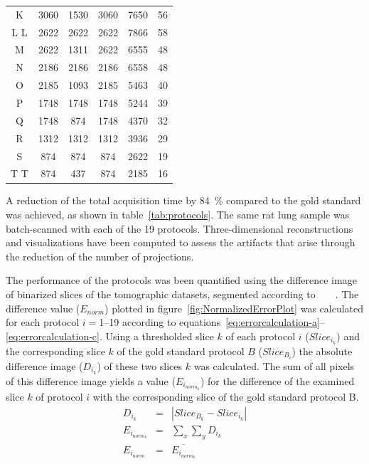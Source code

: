 \begin{table}
\begin{tabular}{cccccc}
		K & 3060 & 1530 & 3060 & 7650  &  56\\%
		\ifiucr
			\rowcolor{lightgray} L 
		\else
		 	L
		 \fi
		 & 2622 & 2622 & 2622 & 7866  &  58\\%
		M & 2622 & 1311 & 2622 & 6555  &  48\\%
		N & 2186 & 2186 & 2186 & 6558  &  48\\%
		O & 2185 & 1093 & 2185 & 5463  &  40\\%
		P & 1748 & 1748 & 1748 & 5244  &  39\\%
		Q & 1748 & 874  & 1748 & 4370  &  32\\%
		R & 1312 & 1312 & 1312 & 3936  &  29\\%
		S & 874  & 874  & 874  & 2622  &  19\\%
		\ifiucr
			\rowcolor{lightgray} T
		\else
		 	T
		 \fi
		& 874  & 437  & 874  & 2185  &  16\\%
	\end{tabular}%
\end{table}

A reduction of the total acquisition time by \SI{84}{\percent} compared to the gold standard was achieved, as shown in table~\ref{tab:protocols}. The same rat lung sample was batch-scanned with each of the 19 protocols. Three-dimensional reconstructions and visualizations have been computed to assess the artifacts that arise through the reduction of the number of projections.

The performance of the protocols was been quantified using the difference image of binarized slices of the tomographic datasets, segmented according to%
\ifhtml%
	~\citet{Otsu1979}%
\else%
	~%
\fi%
. The difference value ($E_{norm}$) plotted in figure~\ref{fig:NormalizedErrorPlot} was calculated for each protocol $i=$1--19 according to equations~\ref{eq:errorcalculation-a}--\ref{eq:errorcalculation-c}. Using a thresholded slice $k$ of each protocol $i$ ($Slice_{i_{k}}$) and the corresponding slice $k$ of the gold standard protocol $B$ ($Slice_{B_{i}}$) the absolute difference image ($D_{i_{k}}$) of these two slices $k$ was calculated. The sum of all pixels of this difference image yields a value ($E_{i_{norm_{k}}}$) for the difference of the examined slice $k$ of protocol $i$ with the corresponding slice of the gold standard protocol B.
\begin{eqnarray}%
	D_{i_{k}} &=& |Slice_{B_{k}}-Slice_{i_{k}}|\label{eq:errorcalculation-a}\\%
	E_{i_{norm_{k}}} &=& \sum_{x}\sum_{y} D_{i_{k}}\label{eq:errorcalculation-b}\\%
	E_{i_{norm}} &=& \overline{E_{i_{norm_{k}}}}\label{eq:errorcalculation-c}%
\end{eqnarray}%

